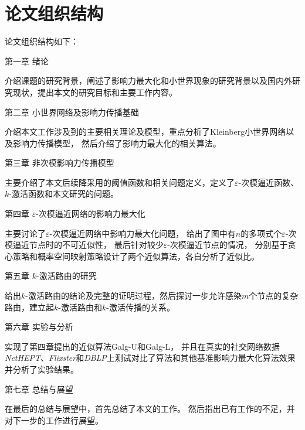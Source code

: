 \section{论文组织结构}
论文组织结构如下：

第一章 绪论

介绍课题的研究背景，阐述了影响力最大化和小世界现象的研究背景以及国内外研究现状，提出本文的研究目标和主要工作内容。

第二章 小世界网络及影响力传播基础

介绍本文工作涉及到的主要相关理论及模型，重点分析了Kleinberg小世界网络以及影响力传播模型，
然后介绍了影响力最大化的相关算法。

第三章 非次模影响力传播模型

主要介绍了本文后续降采用的阈值函数和相关问题定义，定义了$\varepsilon$-次模逼近函数、$k$-激活函数和本文研究的问题。

第四章 $\varepsilon$-次模逼近网络的影响力最大化

主要讨论了$\varepsilon$-次模逼近网络中影响力最大化问题，
给出了图中有$n$的多项式个$\varepsilon$-次模逼近节点时的不可近似性，
最后针对较少$\varepsilon$-次模逼近节点的情况，
分别基于贪心策略和概率空间映射策略设计了两个近似算法，各自分析了近似比。


第五章 $k$-激活路由的研究

给出$k$-激活路由的结论及完整的证明过程，然后探讨一步允许感染$m$个节点的复杂路由，建立起$k$-激活路由和$k$-激活传播的关系。


第六章 实验与分析

实现了第四章提出的近似算法\textsf{Galg-U}和\textsf{Galg-L}，
并且在真实的社交网络数据{\em NetHEPT}、{\em Flixster}和{\em DBLP}上测试对比了算法和其他基准影响力最大化算法效果并分析了实验结果。

第七章 总结与展望

在最后的总结与展望中，首先总结了本文的工作。
然后指出已有工作的不足，并对下一步的工作进行展望。
